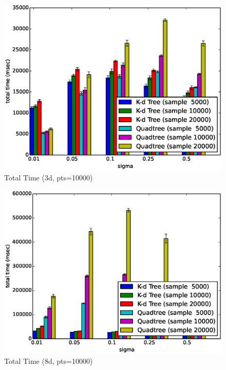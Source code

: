 \documentclass[mcs]{scsthesis}
\begin{document}
\begin{figure}
\begin{center}
\includegraphics[scale=0.5]{diagrams/3d_qt_kt_pts10000_total.eps}
\caption{Total Time (3d, pts=10000)}
\label{fig:3d_kd_qt_total}
\end{center}
\end{figure}

\begin{figure}
\begin{center}
\includegraphics[scale=0.5]{diagrams/8d_qt_kt_pts10000_total.eps}
\caption{Total Time (8d, pts=10000)}
\label{fig:8d_kd_qt_total}
\end{center}
\end{figure}
\end{document}
